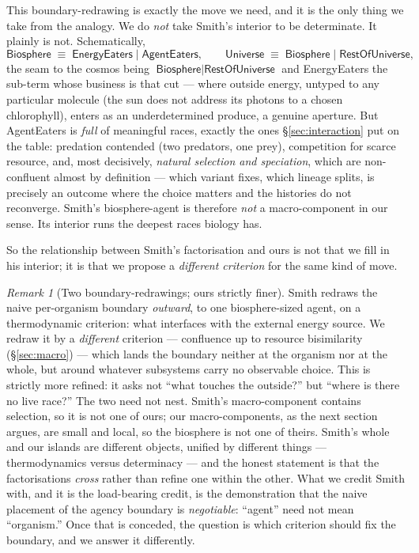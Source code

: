 \documentclass[11pt]{article}
\theoremstyle{definition}
\theoremstyle{plain}
\theoremstyle{remark}
\newtheorem{remark}{Remark}
\newcommand{\rcong}{\equiv}
\newcommand{\Cut}{\mid}
\begin{document}
This boundary-redrawing is exactly the move we need, and it is the only thing we take
from the analogy. We do \emph{not} take Smith's interior to be determinate. It plainly
is not. Schematically,
\[
\textsf{Biosphere} \;\rcong\; \textsf{EnergyEaters} \Cut \textsf{AgentEaters},
\qquad
\textsf{Universe} \;\rcong\; \textsf{Biosphere} \Cut \textsf{RestOfUniverse},
\]
the seam to the cosmos being $\textsf{Biosphere} \Cut \textsf{RestOfUniverse}$ and
\textsf{EnergyEaters} the sub-term whose business is that cut --- where outside energy,
untyped to any particular molecule (the sun does not address its photons to a chosen
chlorophyll), enters as an underdetermined produce, a genuine aperture. But
\textsf{AgentEaters} is \emph{full} of meaningful races, exactly the ones
\S\ref{sec:interaction} put on the table: predation contended (two predators, one
prey), competition for scarce resource, and, most decisively, \emph{natural selection
and speciation}, which are non-confluent almost by definition --- which variant fixes,
which lineage splits, is precisely an outcome where the choice matters and the
histories do not reconverge. Smith's biosphere-agent is therefore \emph{not} a
macro-component in our sense. Its interior runs the deepest races biology has.

So the relationship between Smith's factorisation and ours is not that we fill in his
interior; it is that we propose a \emph{different criterion} for the same kind of move.

\begin{remark}[Two boundary-redrawings; ours strictly finer]\label{rmk:refine}
Smith redraws the naive per-organism boundary \emph{outward}, to one biosphere-sized
agent, on a thermodynamic criterion: what interfaces with the external energy source.
We redraw it by a \emph{different} criterion --- confluence up to resource bisimilarity
(\S\ref{sec:macro}) --- which lands the boundary neither at the organism nor at the
whole, but around whatever subsystems carry no observable choice. This is strictly more
refined: it asks not ``what touches the outside?'' but ``where is there no live race?''
The two need not nest. Smith's macro-component contains selection, so it is not one of
ours; our macro-components, as the next section argues, are small and local, so the
biosphere is not one of theirs. Smith's whole and our islands are different objects,
unified by different things --- thermodynamics versus determinacy --- and the honest
statement is that the factorisations \emph{cross} rather than refine one within the
other. What we credit Smith with, and it is the load-bearing credit, is the
demonstration that the naive placement of the agency boundary is \emph{negotiable}:
``agent'' need not mean ``organism.'' Once that is conceded, the question is which
criterion should fix the boundary, and we answer it differently.
\end{remark}
\end{document}
